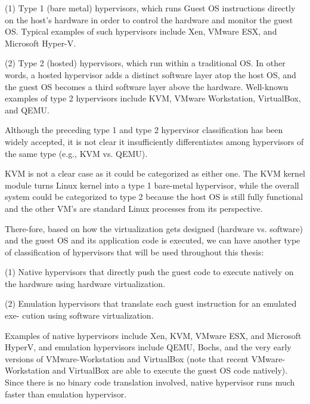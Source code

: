 \documentclass{report}
\begin{document}
\begin{spacing}{1.5}
{\large 
(1) Type 1 (bare metal) hypervisors, which runs Guest OS instructions directly on the host’s hardware in order to control
the hardware and monitor the guest OS. Typical examples of such hypervisors include Xen, VMware ESX, and Microsoft Hyper-V.
\newline
}

{\large
(2) Type 2 (hosted) hypervisors, which run within a traditional OS. In other words, a
hosted hypervisor adds a distinct software layer atop the host OS, and the guest OS becomes a third
software layer above the hardware. Well-known examples of type 2 hypervisors include KVM, 
VMware Workstation, VirtualBox, and QEMU.
\newline
}

{\large
Although the preceding type 1 and type 2 hypervisor classification has been widely
accepted, it is not clear it insufficiently differentiates among hypervisors of the same type (e.g., KVM vs. QEMU).


KVM is not a clear case as it could be categorized as either one. The KVM kernel module turns Linux kernel into a type 1 bare-metal hypervisor, while the overall system could be categorized to type 2 because the host OS is still fully functional and the other VM's are standard Linux processes from its perspective.


There-fore, based on how the virtualization gets designed (hardware vs. software) and the guest OS and its 
application code is executed, we can have another type of classification of hypervisors that will be used 
throughout this thesis:
\newline
}

{\large
(1) Native hypervisors that directly push the guest code to execute natively on the
hardware using hardware virtualization.
\newline
}


{\large
(2) Emulation hypervisors that translate each guest instruction for an emulated exe-
cution using software virtualization.
\newline
}

{\large
Examples of native hypervisors include Xen, KVM, VMware ESX, and Microsoft HyperV, and emulation hypervisors include QEMU, Bochs, and the very early versions of
VMware-Workstation and VirtualBox (note that recent VMware-Workstation and VirtualBox are able to execute the guest OS code natively). Since there is no binary code
translation involved, native hypervisor runs much faster than emulation hypervisor.

}
\end{spacing}
\end{document}
